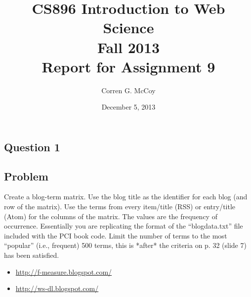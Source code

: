 \documentclass[letterpaper,11pt]{report}
\begin{document}
 
\begin{savenotes}
\pagestyle{plain}
\title{CS896 Introduction to Web Science\\Fall 2013\\Report for Assignment 9}
\author{Corren G. McCoy}
 
\date{December 5, 2013}
\maketitle

\renewcommand*\thesection{\arabic{section}}
\setcounter{section}{0}

\setcounter{tocdepth}{4}
\tableofcontents
 \listoffigures
\newpage


\section{Question 1}
\subsection{Problem}Create a blog-term matrix. Use the blog title as the identifier for each blog (and row of the matrix).  Use the terms from every item/title (RSS) or entry/title (Atom) for the columns of the matrix.  The values are the frequency of occurrence.  Essentially you are replicating the format of the ``blogdata.txt'' file included with the PCI book code.  Limit the number of terms to the most ``popular'' (i.e., frequent) 500 terms, this is *after* the criteria on p. 32 (slide 7) has been satisfied.
\begin{itemize}
\item \url{http://f-measure.blogspot.com/}
\item \url{http://ws-dl.blogspot.com/}
\end{itemize}


\end{savenotes}
\end{document}
